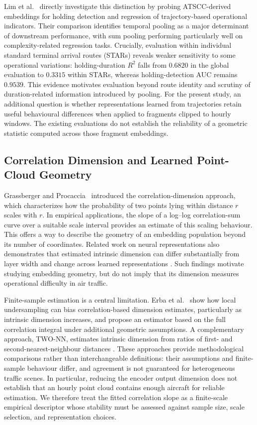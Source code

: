 Lim et al.~\cite{limcontrastive} directly investigate this distinction by probing
ATSCC-derived embeddings for holding detection and regression of
trajectory-based operational indicators. Their comparison identifies
temporal pooling as a major determinant of downstream performance, with
sum pooling performing particularly well on complexity-related regression
tasks. Crucially, evaluation within individual standard terminal arrival
routes (STARs) reveals weaker sensitivity to some operational variations:
holding-duration $R^2$ falls from $0.6820$ in the global evaluation to
$0.3315$ within STARs, whereas holding-detection AUC remains $0.9539$.
This evidence motivates evaluation beyond route identity and scrutiny of
duration-related information introduced by pooling. For the present
study, an additional question is whether representations learned from
trajectories retain useful behavioural differences when applied to
fragments clipped to hourly windows. The existing evaluations do not
establish the reliability of a geometric statistic computed across those
fragment embeddings.

\subsection{Correlation Dimension and Learned Point-Cloud Geometry}
\label{sec:rw-dimension}
Grassberger and Procaccia~\cite{grassberger1983measuring} introduced the correlation-dimension
approach, which characterizes how the probability of two points lying
within distance $r$ scales with $r$. In empirical applications, the slope
of a log--log correlation-sum curve over a suitable scale interval
provides an estimate of this scaling behaviour. This offers a way to
describe the geometry of an embedding population beyond its number of
coordinates. Related work on neural representations also demonstrates
that estimated intrinsic dimension can differ substantially from layer
width and change across learned representations
\cite{ansuini2019intrinsic}. Such findings motivate studying embedding
geometry, but do not imply that its dimension measures operational
difficulty in air traffic.

Finite-sample estimation is a central limitation.
Erba et al.~\cite{erba2019intrinsic} show how local undersampling can bias
correlation-based dimension estimates, particularly as intrinsic
dimension increases, and propose an estimator based on the full
correlation integral under additional geometric assumptions. A
complementary approach, TWO-NN, estimates intrinsic dimension from ratios
of first- and second-nearest-neighbour distances
\cite{facco2017estimating}. These approaches provide methodological
comparisons rather than interchangeable definitions: their assumptions
and finite-sample behaviour differ, and agreement is not guaranteed for
heterogeneous traffic scenes. In particular, reducing the encoder output
dimension does not establish that an hourly point cloud contains enough
aircraft for reliable estimation. We therefore treat the fitted
correlation slope as a finite-scale empirical descriptor whose
stability must be assessed against sample size, scale selection, and
representation choices.

